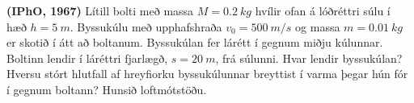 \begin{enumerate}[label = \textbf{Dæmi \thechapter.\arabic*.}]
\begin{minipage}{\linewidth}
\item \textbf{(IPhO, 1967)} Lítill bolti með massa $M = \SI{0.2}{kg}$ hvílir ofan á lóðréttri súlu í hæð $h = \SI{5}{m}$. Byssukúlu með upphafshraða $v_0 = \SI{500}{m/s}$ og massa $m = \SI{0.01}{kg}$ er skotið í átt að boltanum. Byssukúlan fer lárétt í gegnum miðju kúlunnar. Boltinn lendir í láréttri fjarlægð, $s = \SI{20}{m}$, frá súlunni. Hvar lendir byssukúlan? Hversu stórt hlutfall af hreyfiorku byssukúlunnar breyttist í varma þegar hún fór í gegnum boltann? Hunsið loftmótstöðu.  

\end{minipage}

\end{enumerate}

\newpage